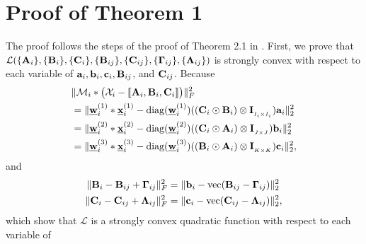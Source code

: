 \documentclass[journal]{IEEEtran}
\newcommand{\cpd}[3]{\llbracket #1, #2, #3 \rrbracket}
\newcommand{\A}{{\bf A}}
\newcommand{\B}{{\bf B}}
\newcommand{\C}{{\bf C}}
\newcommand{\Ten}[1]{\mathcal{#1}}
\begin{document}
\section{Proof of Theorem 1}
The proof follows the steps of the proof of Theorem 2.1  in \cite{Xu2012}. First, we prove that $\mathcal{L}(\{\A_i\}, \{\B_i\}, \{\C_i\}, \{\B_{ij}\}, \{\C_{ij}\}, \{{\bf{\Gamma}}_{ij}\}, \{{\bf{\Lambda}}_{ij}\})$ is strongly convex with respect to each variable of 
${\bf a}_i, {\bf b}_i, {\bf c}_i,\B_{ij}$, and $\C_{ij}$. 
Because 
\begin{align*}
  &\|\Ten{M}_i * \big(\Ten{X}_i - {\cpd{\A_i}{\B_i}{\C_i}} \big)\|_F^2\\
    &=\|\underline{\bf w}_i^{(1)} * \underline{\bf x}_i^{(1)}-\text{diag}(\underline{\bf w}_i^{(1)})((\C_i\odot \B_i)\otimes {\bf I}_{_{I_i\times I_i}}){\bf a}_i\|_2^2\\
    &=\|\underline{\bf w}_i^{(2)} * \underline{\bf x}_i^{(2)}-\text{diag}(\underline{\bf w}_i^{(2)})((\C_i\odot \A_i)\otimes {\bf I}_{_{J\times J}}){\bf b}_i\|_2^2\\
    &=\|\underline{\bf w}_i^{(3)} * \underline{\bf x}_i^{(3)}-\text{diag}(\underline{\bf w}_i^{(3)})((\B_i\odot \A_i)\otimes {\bf I}_{_{K\times K}}){\bf c}_i\|_2^2,
\end{align*}
and 
\begin{align*}
    \|\B_{i}-\B_{ij}+{\bf{\Gamma}}_{ij}\|_F^2&=\|{\bf b}_i-\text{vec}(\B_{ij}-{\bf{\Gamma}}_{ij})\|_2^2\\
     \|\C_{i}-\C_{ij}+{\bf{\Lambda}}_{ij}\|_F^2&=\|{\bf c}_i-\text{vec}(\C_{ij}-{\bf{\Lambda}}_{ij})\|_2^2,
\end{align*}
which show that $\mathcal{L}$ is a strongly convex quadratic function with respect to each variable of 
\end{document}
